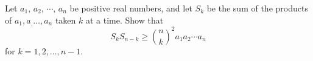 Let $a_1$, $a_2$, $\cdots$, $a_n$ be positive real numbers, and let $S_k$ be the sum of the products of $a_1,a_,\ldots,a_n$ taken $k$ at a time.  Show that \[ S_k S_{n-k} \geq {n \choose k}^2 a_1 a_2 \cdots a_n \] for $k = 1,2,\ldots,n - 1$.
